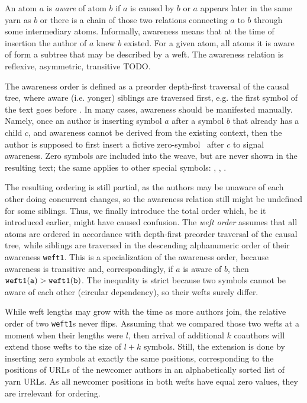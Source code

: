 \documentclass{acm_proc_article-sp}
\begin{document}
An atom $a$ is \emph{aware} of atom $b$ if $a$ is caused
by $b$ or $a$ appears later in the same yarn as $b$ or
there is a chain of those two relations connecting $a$ to 
$b$ through some intermediary atoms.
Informally, awareness means that at the time of insertion
the author of $a$ knew $b$ existed. For a given atom, all
atoms it is aware of form a subtree that may be described
by a weft.
The awareness relation is reflexive, asymmetric, transitive TODO.

The awareness order is 
defined as a preorder depth-first traversal of the causal
tree, where aware (i.e. yonger) siblings are traversed first,
e.g. the first symbol of the text goes
before \eoa. In many cases, awareness should be manifested
manually. Namely, once an author is inserting symbol $a$ after
a symbol $b$ that already has a child $c$, and awareness
cannot be derived from the existing context, then the author is
supposed to first insert a fictive zero-symbol \zero ~after $c$
to signal awareness.
Zero symbols are included into the
weave, but are never shown in the resulting text; the same
applies to other special symbols: \aum, \eoa, \bsp.

The resulting ordering is still partial, as the authors
may be unaware of each other doing concurrent changes, so
the awareness relation still might be undefined for some
siblings. Thus, we finally introduce the total order
which, be it introduced earlier, might have caused confusion.
The \emph{weft order} assumes that all atoms are ordered in
accordance with depth-first preorder traversal of the causal
tree, while siblings are traversed in the descending 
alphanumeric order of their awareness {\tt weft1}.
This is a specialization of the awareness order, because
awareness is transitive and, correspondingly, if $a$ is
aware of $b$, then $\tt weft1(a) > weft1(b)$. The inequality is
strict because two symbols cannot be aware of each other
(circular dependency), so their wefts surely differ.

While weft lengths may grow with the time as more authors
join, the relative order of two {\tt weft1}s never flips.
Assuming that we compared those two wefts at a moment when
their lengths were $l$, then arrival of additional $k$ coauthors
will extend those wefts to the size of $l+k$ symbols. Still,
the extension is done by inserting zero symbols at exactly
the same positions, corresponding to the positions of URLs
of the newcomer authors in an alphabetically sorted list
of yarn URLs. As all newcomer positions in both wefts have
equal zero values, they are irrelevant for ordering.
\end{document}
